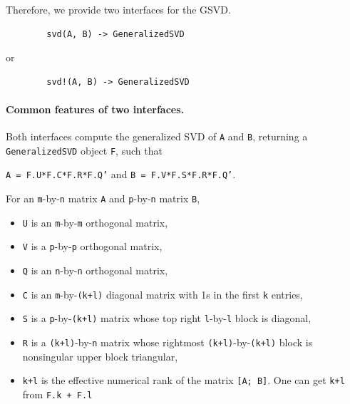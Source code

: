 \bigskip

Therefore, we provide two interfaces for the GSVD.  
\begin{verbatim} 
        svd(A, B) -> GeneralizedSVD
\end{verbatim} 
or
\begin{verbatim} 
        svd!(A, B) -> GeneralizedSVD
\end{verbatim} 

\paragraph{Common features of two interfaces.} 
Both interfaces compute the generalized SVD of \texttt{A} and \texttt{B},
returning a \texttt{GeneralizedSVD} object \texttt{F}, 
such that 
\begin{center} 
\texttt{A = F.U*F.C*F.R*F.Q'} 
\quad and \quad 
\texttt{B = F.V*F.S*F.R*F.Q'}. 
\end{center} 
For an \texttt{m}-by-\texttt{n} matrix \texttt{A} and \texttt{p}-by-\texttt{n} matrix \texttt{B},
\begin{itemize}
\item \texttt{U} is an \texttt{m}-by-\texttt{m} orthogonal matrix,
\item \texttt{V} is a \texttt{p}-by-\texttt{p} orthogonal matrix,
\item \texttt{Q} is an \texttt{n}-by-\texttt{n} orthogonal matrix,
\item \texttt{C} is an \texttt{m}-by-\texttt{(k+l)} diagonal matrix with 1s in the first \texttt{k} entries,
\item \texttt{S} is a \texttt{p}-by-\texttt{(k+l)} matrix whose top right \texttt{l}-by-\texttt{l} block is diagonal,
\item \texttt{R} is a \texttt{(k+l)}-by-\texttt{n} matrix whose rightmost \texttt{(k+l)}-by-\texttt{(k+l)} block is nonsingular upper block triangular,
\item \texttt{k+l} is the effective numerical 
rank of the matrix \texttt{[A; B]}. One can get {\tt k+l}
from {\tt F.k + F.l} 
\end{itemize}

